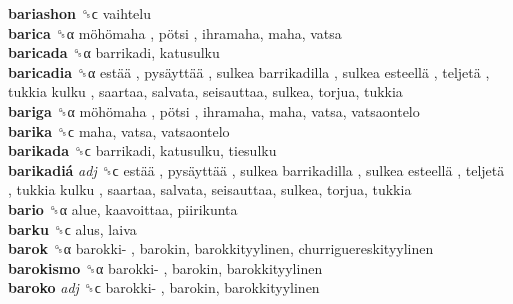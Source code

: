 \textbf{bariashon} ␝ϲ  vaihtelu  \\
\textbf{barica} ␝α   möhömaha ,  pötsi , ihramaha, maha, vatsa  \\
\textbf{baricada} ␝α  barrikadi, katusulku  \\
\textbf{baricadia} ␝α   estää ,  pysäyttää ,  sulkea barrikadilla ,  sulkea esteellä ,  teljetä ,  tukkia kulku , saartaa, salvata, seisauttaa, sulkea, torjua, tukkia  \\
\textbf{bariga} ␝α   möhömaha ,  pötsi , ihramaha, maha, vatsa, vatsaontelo  \\
\textbf{barika} ␝ϲ  maha, vatsa, vatsaontelo  \\
\textbf{barikada} ␝ϲ  barrikadi, katusulku, tiesulku  \\
\textbf{barikadiá} \emph{adj}  ␝ϲ   estää ,  pysäyttää ,  sulkea barrikadilla ,  sulkea esteellä ,  teljetä ,  tukkia kulku , saartaa, salvata, seisauttaa, sulkea, torjua, tukkia  \\
\textbf{bario} ␝α  alue, kaavoittaa, piirikunta  \\
\textbf{barku} ␝ϲ  alus, laiva  \\
\textbf{barok} ␝α   barokki- , barokin, barokkityylinen, churriguereskityylinen  \\
\textbf{barokismo} ␝α   barokki- , barokin, barokkityylinen  \\
\textbf{baroko} \emph{adj}  ␝ϲ   barokki- , barokin, barokkityylinen  \\
